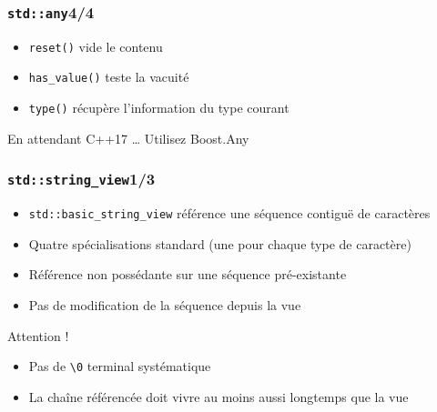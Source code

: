\documentclass[C++.tex]{subfiles}
\begin{document}
\begin{frame}[fragile]
	\frametitle{\lstinline|std::any|\titlehfill{}4/4}
	\begin{itemize}
		\item \lstinline|reset()| vide le contenu
		\item \lstinline|has_value()| teste la vacuité
		\item \lstinline|type()| récupère l'information du type courant
	\end{itemize}

	\begin{block}{En attendant C++17 \ldots}
		Utilisez Boost.Any
	\end{block}
\end{frame}

\begin{frame}[fragile]
	\frametitle{\lstinline|std::string_view|\titlehfill{}1/3}
	\begin{itemize}
		\item \lstinline|std::basic_string_view| référence une séquence contiguë de caractères
		\item Quatre spécialisations standard (une pour chaque type de caractère)


		\item Référence non possédante sur une séquence pré-existante
		\item Pas de modification de la séquence depuis la vue
	\end{itemize}

	\begin{alertblock}{Attention !}
		\begin{itemize}
			\item Pas de \lstinline|\0| terminal systématique
			\item La chaîne référencée doit vivre au moins aussi longtemps que la vue
		\end{itemize}
	\end{alertblock}
\end{frame}
\end{document}
